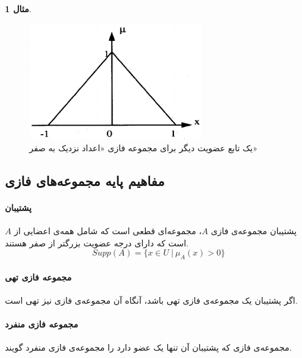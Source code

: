 \documentclass[12pt,a4paper]{article}
\theoremstyle{definition}
\newtheorem{exmp}{مثال}[section]
\begin{document}
\begin{exmp}
\begin{figure}[h]
	\centering 
	\includegraphics[width=75mm]{Images/Fig4.png}
	\vspace{-0.3cm}
	\caption{یک تابع عضویت دیگر برای مجموعه فازی «اعداد نزدیک به صفر»}\label{fig:f_4}
\end{figure}
\end{exmp}

 \subsection{ مفاهیم پایه مجموعه‌های فازی}
\paragraph{پشتیبان}
 پشتیبان مجموعه‌ی فازی $A$، مجموعه‌ای قطعی است که شامل همه‌ی اعضایی از $A$ است که دارای درجه عضویت بزرگتر از صفر هستند.
 \begin{equation}\label{eq:e_supp}
 	Supp(A)=\{ x \in U\ |\ \mu_{A}(x) > 0 \}
\end{equation}
\paragraph{مجموعه فازی تهی}
اگر پشتیبان یک مجموعه‌ی فازی تهی باشد، آنگاه آن مجموعه‌ی فازی نیز تهی است. 
\paragraph{مجموعه‌ فازی منفرد}
مجموعه‌ی فازی که پشتیبان آن تنها یک عضو دارد را مجموعه‌ی فازی منفرد
 گویند.
\end{document}
